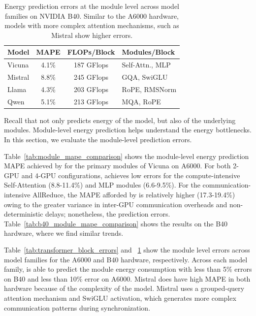 \begin{table}[t]
\centering
\small
\setlength{\tabcolsep}{4pt}
\renewcommand{\arraystretch}{1.05}

\begin{tabular}{lccl}
\hline
\textbf{Model} & \textbf{MAPE} & \textbf{FLOPs/Block} & \textbf{Modules/Block} \\
\hline
\rowcolor{rowblue} Vicuna & 4.1\% & 187 GFlops & Self-Attn., MLP \\
Mistral                   & 8.8\% & 245 GFlops & GQA, SwiGLU \\
\rowcolor{rowblue} Llama  & 4.3\% & 203 GFlops & RoPE, RMSNorm \\
Qwen                      & 5.1\% & 213 GFlops & MQA, RoPE \\
\hline
\end{tabular}

\caption{Energy prediction errors at the module level across model families on NVIDIA B40. Similar to the A6000 hardware, models with more complex attention mechanisms, such as Mistral show higher errors.}
\label{tab:b40_transformer_block_errors}
\end{table}


Recall that \sys{} not only predicts energy of the model, but also of the underlying modules. Module-level energy prediction helps understand the energy bottlenecks. In this section, we evaluate the \sys{} module-level prediction errors. 

Table~\ref{tab:module_mape_comparison} shows the module-level energy prediction MAPE achieved by \sys{} for the primary modules of Vicuna on A6000. For both 2-GPU and 4-GPU configurations, \sys{} achieves low errors for the compute-intensive Self-Attention (8.8-11.4\%) and MLP modules (6.6-9.5\%). For the communication-intensive AllReduce, the MAPE afforded by \sys{} is relatively higher (17.3-19.4\%) owing to the greater variance in inter-GPU communication overheads and non-deterministic delays; nonetheless, the prediction errors. %
Table~\ref{tab:b40_module_mape_comparison} shows the results on the B40 hardware, where we find similar trends.

Table~\ref{tab:transformer_block_errors} and ~\ref{tab:b40_transformer_block_errors} show the module level errors across model families for the A6000 and B40 hardware, respectively. Across each model family, \sys{} is able to predict the module energy consumption with less than 5\% errors on B40 and less than 10\% error on A6000. Mistral does have high MAPE in both hardware because of the complexity of the model. Mistral uses a grouped-query attention mechanism and SwiGLU activation, which generates more complex communication patterns during synchronization.

